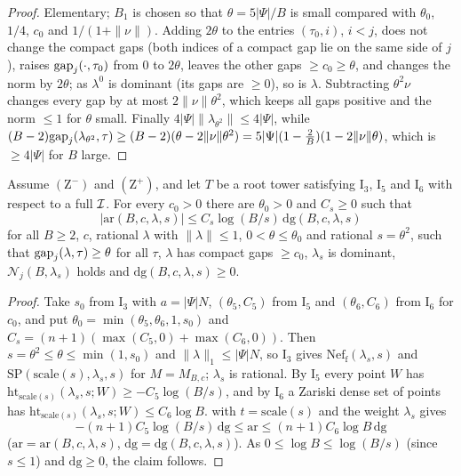 \begin{proof}
Elementary; $B_1$ is chosen so that $\theta=5|\Psi|/B$ is small compared with $\theta_0$, $1/4$, $c_0$ and
$1/(1+\|\nu\|)$. Adding $2\theta$ to the entries $(\tau_0,i)$, $i<j$, does not change the compact gaps (both
indices of a compact gap lie on the same side of $j$), raises $\mathrm{gap}_j(\cdot,\tau_0)$ from $0$ to $2\theta$,
leaves the other gaps $\ge c_0\ge\theta$, and changes the norm by $2\theta$; as $\lambda^0$ is dominant
(its gaps are $\ge0$), so is $\lambda$. Subtracting $\theta^2\nu$ changes every gap by at most
$2\|\nu\|\theta^2$, which keeps all gaps positive and the norm $\le1$ for $\theta$ small. Finally
$4|\Psi|\|\lambda_{\theta^2}\|\le4|\Psi|$, while
$(B-2)\mathrm{gap}_j(\lambda_{\theta^2},\tau)\ge(B-2)(\theta-2\|\nu\|\theta^2)=5|\Psi|(1-\frac2B)(1-2\|\nu\|\theta)$,
which is $\ge4|\Psi|$ for $B$ large.
\end{proof}

\begin{proposition}[Squeeze]\label{pf:volthm:prop:squeeze}
Assume $(\mathrm{Z}^-)$ and $(\mathrm{Z}^+)$, and let $T$ be a root
tower satisfying $\mathrm{I}_3$, $\mathrm{I}_5$ and $\mathrm{I}_6$ with respect to a full $\mathcal{I}$. For every
$c_0>0$ there are $\theta_0>0$ and $C_s\ge0$ such that
\[
|\mathrm{ar}(B,c,\lambda,s)|\le C_s\log(B/s)\,\mathrm{dg}(B,c,\lambda,s)
\]
for all $B\ge2$, $c$, rational $\lambda$ with $\|\lambda\|\le1$, $0<\theta\le\theta_0$ and rational
$s=\theta^2$, such that $\mathrm{gap}_j(\lambda,\tau)\ge\theta$ for all $\tau$, $\lambda$ has compact gaps $\ge c_0$,
$\lambda_s$ is dominant, $\mathcal N_j(B,\lambda_s)$ holds and $\mathrm{dg}(B,c,\lambda,s)\ge0$.
\end{proposition}

\begin{proof}
Take $s_0$ from $\mathrm{I}_3$ with $a=|\Psi|N$, $(\theta_5,C_5)$ from $\mathrm{I}_5$ and $(\theta_6,C_6)$ from
$\mathrm{I}_6$ for $c_0$, and put $\theta_0=\min(\theta_5,\theta_6,1,s_0)$ and
$C_s=(n+1)(\max(C_5,0)+\max(C_6,0))$. Then $s=\theta^2\le\theta\le\min(1,s_0)$ and
$\|\lambda\|_1\le|\Psi|N$, so $\mathrm{I}_3$ gives $\mathrm{Nef}_{\mathrm f}(\lambda_s,s)$ and
$\mathrm{SP}(\mathrm{scale}(s),\lambda_s,s)$ for $M=M_{B,c}$; $\lambda_s$ is rational. By $\mathrm{I}_5$ every
point $W$ has $\mathrm{ht}_{\mathrm{scale}(s)}(\lambda_s,s;W)\ge-C_5\log(B/s)$, and by $\mathrm{I}_6$ a Zariski dense
set of points has $\mathrm{ht}_{\mathrm{scale}(s)}(\lambda_s,s;W)\le C_6\log B$.  with
$t=\mathrm{scale}(s)$ and the weight $\lambda_s$ gives
\[
-(n+1)C_5\log(B/s)\,\mathrm{dg}\le\mathrm{ar}\le(n+1)C_6\log B\,\mathrm{dg}
\]
($\mathrm{ar}=\mathrm{ar}(B,c,\lambda,s)$, $\mathrm{dg}=\mathrm{dg}(B,c,\lambda,s)$). As $0\le\log B\le\log(B/s)$
(since $s\le1$) and $\mathrm{dg}\ge0$, the claim follows.
\end{proof}

